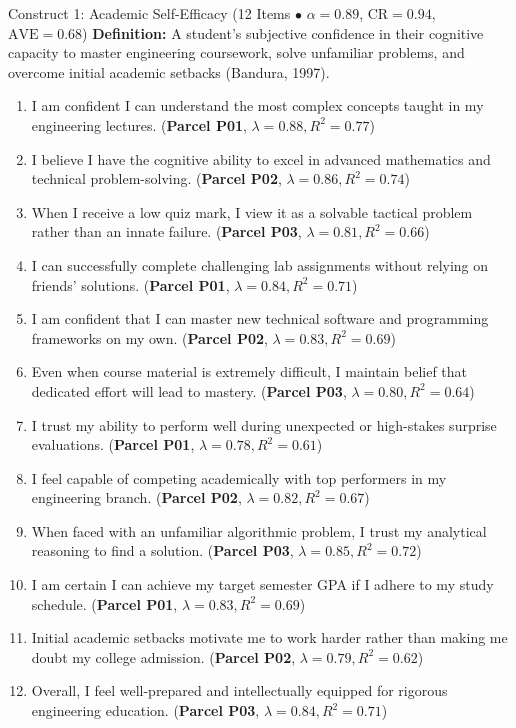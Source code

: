 \documentclass[10pt,a4paper]{article}
\begin{document}
\begin{constructbox}{Construct 1: Academic Self-Efficacy (12 Items $\bullet$ $\alpha = 0.89$, $\text{CR} = 0.94$, $\text{AVE} = 0.68$)}
\textbf{Definition:} A student's subjective confidence in their cognitive capacity to master engineering coursework, solve unfamiliar problems, and overcome initial academic setbacks (Bandura, 1997).
\begin{enumerate}[label=\textbf{Q\arabic*.}, leftmargin=2.5em, itemsep=2pt]
  \item I am confident I can understand the most complex concepts taught in my engineering lectures. \hfill (\textbf{Parcel P01}, $\lambda = 0.88, R^2 = 0.77$)
  \item I believe I have the cognitive ability to excel in advanced mathematics and technical problem-solving. \hfill (\textbf{Parcel P02}, $\lambda = 0.86, R^2 = 0.74$)
  \item When I receive a low quiz mark, I view it as a solvable tactical problem rather than an innate failure. \hfill (\textbf{Parcel P03}, $\lambda = 0.81, R^2 = 0.66$)
  \item I can successfully complete challenging lab assignments without relying on friends' solutions. \hfill (\textbf{Parcel P01}, $\lambda = 0.84, R^2 = 0.71$)
  \item I am confident that I can master new technical software and programming frameworks on my own. \hfill (\textbf{Parcel P02}, $\lambda = 0.83, R^2 = 0.69$)
  \item Even when course material is extremely difficult, I maintain belief that dedicated effort will lead to mastery. \hfill (\textbf{Parcel P03}, $\lambda = 0.80, R^2 = 0.64$)
  \item I trust my ability to perform well during unexpected or high-stakes surprise evaluations. \hfill (\textbf{Parcel P01}, $\lambda = 0.78, R^2 = 0.61$)
  \item I feel capable of competing academically with top performers in my engineering branch. \hfill (\textbf{Parcel P02}, $\lambda = 0.82, R^2 = 0.67$)
  \item When faced with an unfamiliar algorithmic problem, I trust my analytical reasoning to find a solution. \hfill (\textbf{Parcel P03}, $\lambda = 0.85, R^2 = 0.72$)
  \item I am certain I can achieve my target semester GPA if I adhere to my study schedule. \hfill (\textbf{Parcel P01}, $\lambda = 0.83, R^2 = 0.69$)
  \item Initial academic setbacks motivate me to work harder rather than making me doubt my college admission. \hfill (\textbf{Parcel P02}, $\lambda = 0.79, R^2 = 0.62$)
  \item Overall, I feel well-prepared and intellectually equipped for rigorous engineering education. \hfill (\textbf{Parcel P03}, $\lambda = 0.84, R^2 = 0.71$)
\end{enumerate}
\end{constructbox}
\end{document}
